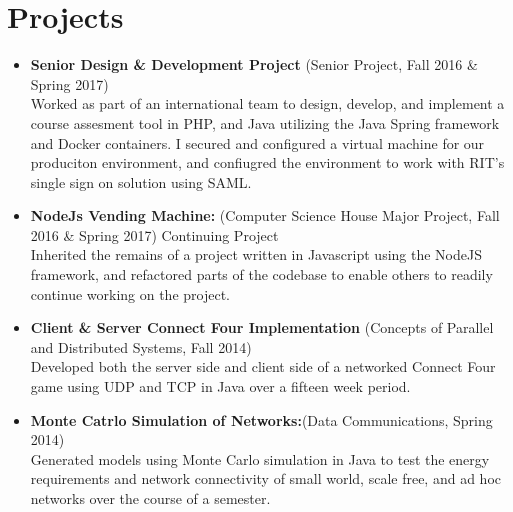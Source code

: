 \documentclass[10pt]{Article}
\begin{document}
\section*{Projects}
\begin{itemize}[topsep=1ex, itemsep=.5ex, parsep=0ex, partopsep=.7ex]
	\item[]{\bf Senior Design \& Development Project} (Senior Project, Fall 2016 \& Spring 2017)\\
	Worked as part of an international team to design, develop, and implement a
	course assesment tool in PHP, and Java utilizing the Java Spring framework and
	 Docker containers. I secured and configured a virtual machine for our
   produciton environment, and confiugred the environment to work with RIT's
   single sign on solution using SAML.
	\item[]{\bf NodeJs Vending Machine:} (Computer Science House Major Project, Fall 2016 \& Spring 2017) Continuing Project\\
	Inherited the remains of a project written in Javascript using the NodeJS
	framework, and refactored parts of the codebase to enable others to readily
	continue working on the project.
	\item[]{\bf Client \& Server Connect Four Implementation} (Concepts of Parallel and Distributed Systems, Fall 2014)\\
  Developed both the server side and client side of a networked Connect Four game using UDP and TCP in Java over a fifteen week period.
	\item[]{\bf Monte Catrlo Simulation of Networks:}(Data Communications, Spring 2014)\\
	Generated models using Monte Carlo simulation in Java to test the energy requirements and network connectivity of small world, scale free, and ad hoc networks over the course of a semester.
\end{itemize}
\end{document}
